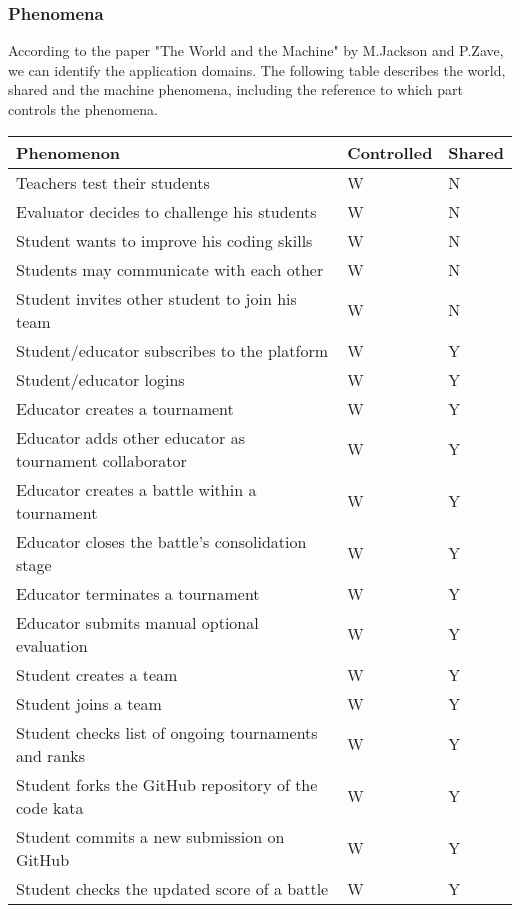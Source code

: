 \subsubsection{Phenomena}
According to the paper "The World and the Machine" by M.Jackson and P.Zave, we can identify the application domains. The following table describes the world, shared and the machine phenomena, including the reference to which part controls the phenomena.
\begin{table}[H]
    \begin{tabular}{|p{9.5cm}|p{2cm}|p{1.5cm}|}
        \hline
        \rowcolor{blue!50}
        Phenomenon & Controlled & Shared \\
        \hline
        Teachers test their students & W & N \\
        Evaluator decides to challenge his students & W & N \\
        Student wants to improve his coding skills & W & N \\
        Students may communicate with each other & W & N \\
        Student invites other student to join his team & W & N \\
        Student/educator subscribes to the platform & W & Y \\
        Student/educator logins & W & Y \\
        Educator creates a tournament & W & Y \\
        Educator adds other educator as tournament collaborator  & W & Y \\
        Educator creates a battle within a tournament & W & Y \\
        Educator closes the battle's consolidation stage & W & Y \\
        Educator terminates a tournament & W & Y \\
        Educator submits manual optional evaluation  & W & Y \\
        Student creates a team & W & Y \\
        Student joins a team & W & Y \\
        Student checks list of ongoing tournaments and ranks & W & Y \\
        Student forks the GitHub repository of the code kata & W & Y \\
        Student commits a new submission on GitHub & W & Y \\
        Student checks the updated score of a battle & W & Y \\

\end{tabular}
\end{table}
